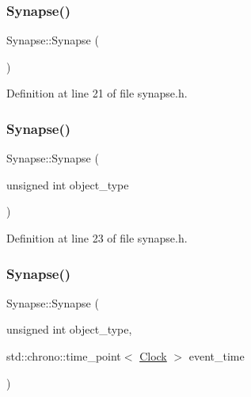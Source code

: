 \subsubsection{\texorpdfstring{Synapse()}{Synapse()}\hspace{0.1cm}{\footnotesize\ttfamily [1/4]}}
{\footnotesize\ttfamily Synapse\+::\+Synapse (\begin{DoxyParamCaption}{ }\end{DoxyParamCaption})\hspace{0.3cm}{\ttfamily [inline]}}



Definition at line 21 of file synapse.\+h.

\mbox{\label{class_synapse_a821e35d693de963edb6d5aa9e565dfde}} 
\subsubsection{\texorpdfstring{Synapse()}{Synapse()}\hspace{0.1cm}{\footnotesize\ttfamily [2/4]}}
{\footnotesize\ttfamily Synapse\+::\+Synapse (\begin{DoxyParamCaption}\item[{unsigned int}]{object\+\_\+type }\end{DoxyParamCaption})\hspace{0.3cm}{\ttfamily [inline]}}



Definition at line 23 of file synapse.\+h.

\mbox{\label{class_synapse_a339a3dff64e545fc7c013b251737257b}} 
\subsubsection{\texorpdfstring{Synapse()}{Synapse()}\hspace{0.1cm}{\footnotesize\ttfamily [3/4]}}
{\footnotesize\ttfamily Synapse\+::\+Synapse (\begin{DoxyParamCaption}\item[{unsigned int}]{object\+\_\+type,  }\item[{std\+::chrono\+::time\+\_\+point$<$ \hyperlink{universe_8h_a0ef8d951d1ca5ab3cfaf7ab4c7a6fd80}{Clock} $>$}]{event\+\_\+time }\end{DoxyParamCaption})\hspace{0.3cm}{\ttfamily [inline]}}



